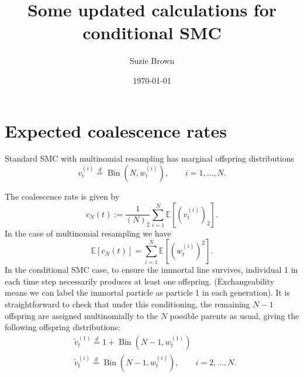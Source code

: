 \documentclass{article}
\title{Some updated calculations for conditional SMC}
\author{Suzie Brown}
\date{\today}
\newcommand{\E}{\mathbb{E}}
\newcommand{\vt}[2][t]{v_{#1}^{(#2)}}
\newcommand{\vttilde}[2][t]{\tilde{v}_{#1}^{(#2)}}
\newcommand{\wt}[2][t]{w_{#1}^{(#2)}}
\newcommand{\eqdist}{\overset{d}{=}}
\newcommand{\Bin}{\operatorname{Bin}}
\begin{document}
\maketitle
\section*{Expected coalescence rates}

Standard SMC with multinomial resampling has marginal offspring distributions
\begin{equation*}
\vt{i} \eqdist \Bin (N, \wt{i}), \qquad i=1,\dots,N.
\end{equation*}

The coalescence rate is given by %
\begin{equation}
c_N(t) := \frac{1}{(N)_2} \sum_{i=1}^{N} \E\left[ (\vt{i})_2 \right].
\end{equation}
In the case of multinomial resampling we have
\begin{equation*}
\E[c_N(t)] = \sum_{i=1}^{N} \E\left[(\wt{i})^2\right].
\end{equation*}
In the conditional SMC case, to ensure the immortal line survives, individual 1 in each time step necessarily produces at least one offspring. (Exchangeability means we can label the immortal particle as particle 1 in each generation). It is straightforward to check that under this conditioning, the remaining $N-1$ offspring are assigned multinomially to the $N$ possible parents as usual, giving the following offspring distributions:
\begin{align*}
& \vttilde{1} \eqdist 1 + \Bin(N-1, \wt{1}) \\
& \vttilde{i} \eqdist \Bin(N-1, \wt{i}), \qquad i=2,\dots,N.
\end{align*}
\end{document}
